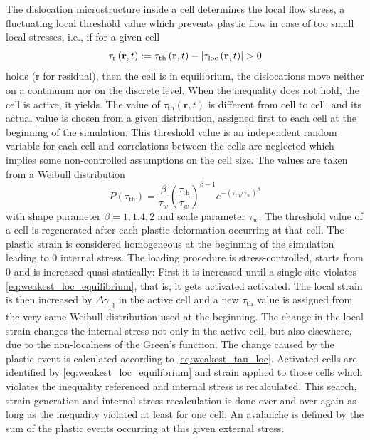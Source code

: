 The dislocation microstructure inside a cell determines the local flow stress, a fluctuating local threshold value which prevents plastic flow in case of too small local stresses, i.e., if for a given cell
\begin{equation} \label{eq:weakest_loc_equilibrium}
{\tau _{\rm{r}}}\left( {{\mathbf{r}},t} \right): = {\tau _{{\text{th}}}}\left( {{\mathbf{r}},t} \right) - \left| {{\tau _{{\text{loc}}}}\left( {{\mathbf{r}},t} \right)} \right| > 0
\end{equation}
holds (r for residual), then the cell is in equilibrium, the dislocations move neither on a continuum nor on the discrete level. When the inequality does not hold, the cell is active, it yields. The value of ${\tau _{{\text{th}}}}\left( {{\mathbf{r}},t} \right)$ is different from cell to cell, and its actual value is chosen from a given distribution, assigned first to each cell at the beginning of the simulation. This threshold value is an independent random variable for each cell and correlations between the cells are neglected which implies some non-controlled assumptions on the cell size. The values are taken from a Weibull distribution 
\begin{equation} \label{eq:weakest_weibull}
P\left( {{\tau _{{\text{th}}}}} \right) = \frac{\beta }{{{\tau _w}}}{\left( {\frac{{{\tau _{{\text{th}}}}}}{{{\tau _w}}}} \right)^{\beta  - 1}}{e^{ - {{\left( {{\tau _{{\text{th}}}}/{\tau _w}} \right)}^\beta }}}
\end{equation}
with shape parameter $\beta=1, 1.4, 2$ and scale parameter ${{\tau _w}}$. The threshold value of a cell is regenerated after each plastic deformation occurring at that cell. The plastic strain is considered homogeneous at the beginning of the simulation leading to 0 internal stress. The loading procedure is stress-controlled, starts from 0 and is increased quasi-statically: First it is increased until a single site violates \cref{eq:weakest_loc_equilibrium}, that is, it gets activated activated. The local strain is then increased by $\Delta {\gamma _{{\text{pl}}}}$ in the active cell and a new ${{\tau _{{\text{th}}}}}$ value is assigned from the very same Weibull distribution used at the beginning. The change in the local strain changes the internal stress not only in the active cell, but also elsewhere, due to the non-localness of the Green's function. The change caused by the plastic event is calculated according to \cref{eq:weakest_tau_loc}. Activated cells are identified by \cref{eq:weakest_loc_equilibrium} and strain applied to those cells which violates the inequality referenced and internal stress is recalculated. This search, strain generation and internal stress recalculation is done over and over again as long as the inequality violated at least for one cell. An avalanche is defined by the sum of the plastic events occurring at this given external stress.

